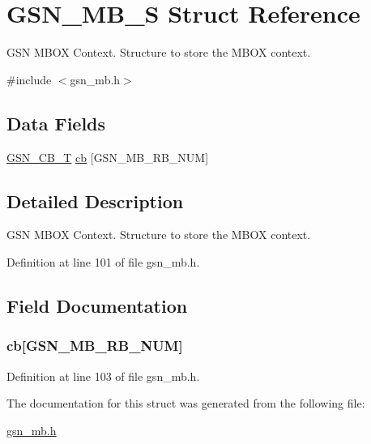 \hypertarget{a00139}{
\section{GSN\_\-MB\_\-S Struct Reference}
\label{a00139}
}


GSN MBOX Context. Structure to store the MBOX context.  




{\ttfamily \#include $<$gsn\_\-mb.h$>$}

\subsection*{Data Fields}
\begin{DoxyCompactItemize}
\item 
\hyperlink{a00036}{GSN\_\-CB\_\-T} \hyperlink{a00139_aa1182621a599cee04ecda1604b15f074}{cb} \mbox{[}GSN\_\-MB\_\-RB\_\-NUM\mbox{]}
\end{DoxyCompactItemize}


\subsection{Detailed Description}
GSN MBOX Context. Structure to store the MBOX context. 

Definition at line 101 of file gsn\_\-mb.h.



\subsection{Field Documentation}
\hypertarget{a00139_aa1182621a599cee04ecda1604b15f074}{
\subsubsection[{cb}]{ {\bf cb}\mbox{[}GSN\_\-MB\_\-RB\_\-NUM\mbox{]}}}
\label{a00139_aa1182621a599cee04ecda1604b15f074}


Definition at line 103 of file gsn\_\-mb.h.



The documentation for this struct was generated from the following file:\begin{DoxyCompactItemize}
\item 
\hyperlink{a00525}{gsn\_\-mb.h}\end{DoxyCompactItemize}
